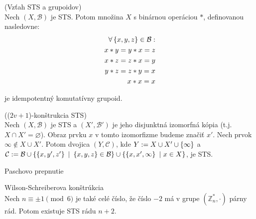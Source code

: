 \begin{theorem}{(Vzťah STS a grupoidov)}\\
Nech $(X, \mathcal{B})$ je STS. Potom množina $X$ s binárnou operáciou $\ast$, definovanou nasledovne:
\begin{align*}
    \forall \left\{x,y,z\right\} \in \mathcal{B}:\\
    x\ast y = y \ast x = z\\ 
    x \ast z = z \ast x = y\\ 
    y\ast z = z \ast y = x\\
    x \ast x = x
\end{align*}

je idempotentný komutatívny grupoid. 
\end{theorem}


\begin{theorem}{(($2v +1$)-konštrukcia STS)}\\
Nech $(X, \mathcal{B})$ je STS a $(X', \mathcal{B}')$ je jeho disjunktná izomorfná kópia (t.j. $X \cap  X' = \varnothing$). Obraz prvku $x$ v tomto izomorfizme budeme značiť $x'$. 
Nech prvok $\infty \notin X \cup X'$.
Potom dvojica $(Y, \mathcal{C})$, kde $Y := X \cup X' \cup \left\{\infty\right\}$ a $\mathcal{C} := \mathcal{B} 
\cup \left\{\left\{x, y', z'\right\} ~|~ \left\{x,y,z\right\}\in \mathcal{B}\right\} 
\cup \left\{\left\{x, x', \infty\right\} ~|~ x \in X\right\}$, je STS.    
\end{theorem}

\TODO Paschovo prepnutie

\begin{theorem}{Wilson-Schreiberova konštrúkcia}\\
	Nech $n \equiv \pm 1 \pmod6$ je také celé číslo, že číslo $-2$ má v grupe $(\mathbb{Z}^*_n, \cdot)$ párny rád. Potom existuje STS rádu $n + 2$.
\end{theorem}

